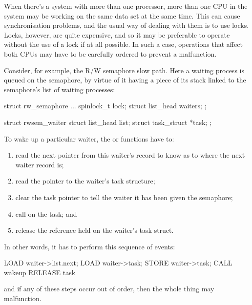 When there's a system with more than one processor, more than one CPU in the
system may be working on the same data set at the same time.
This can cause synchronisation problems, and the usual way of dealing with
them is to use locks.
Locks, however, are quite expensive, and so it may be preferable to operate
without the use of a lock if at all possible.
In such a case, operations that affect both CPUs may have to be carefully
ordered to prevent a malfunction.

Consider, for example, the R/W semaphore slow path.
Here a waiting process is queued on the semaphore, by virtue of it having
a piece of its stack linked to the semaphore's list of waiting processes:

\begin{VerbatimU}
	struct rw_semaphore {
		...
		spinlock_t lock;
		struct list_head waiters;
	};

	struct rwsem_waiter {
		struct list_head list;
		struct task_struct *task;
	};
\end{VerbatimU}

To wake up a particular waiter, the  or 
functions have to:

\begin{enumerate}
 \item
     read the next pointer from this waiter's record to know as to where the
     next waiter record is;

 \item
     read the pointer to the waiter's task structure;

 \item
     clear the task pointer to tell the waiter it has been given the semaphore;

 \item
     call  on the task; and

 \item
     release the reference held on the waiter's task struct.
\end{enumerate}

In other words, it has to perform this sequence of events:

\begin{VerbatimU}
	LOAD waiter->list.next;
	LOAD waiter->task;
	STORE waiter->task;
	CALL wakeup
	RELEASE task
\end{VerbatimU}

and if any of these steps occur out of order, then the whole thing may
malfunction.

